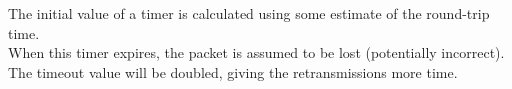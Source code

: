 The initial value of a timer is calculated using some estimate of the round-trip time. \\
When this timer expires, the packet is assumed to be lost (potentially incorrect).
The timeout value will be doubled, giving the retransmissions more time.